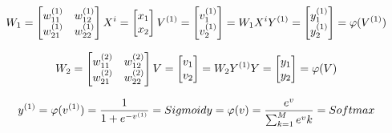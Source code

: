 \documentclass[a4paper]{article}
\begin{document}
\begin{equation}
\newline W_1=\begin{bmatrix}
w^{(1)}_{11}&w^{(1)}_{12}\\ 
w^{(1)}_{21}&w^{(1)}_{22}
\end{bmatrix}
\newline X^{i} = \begin{bmatrix}x_1\\ x_2\end{bmatrix}
\newline V^{(1)} = \begin{bmatrix}v_1^{(1)}\\v_2^{(1)}\end{bmatrix} = W_1X^{i}
\newline Y^{(1)} = \begin{bmatrix}y_1^{(1)}\\y_2^{(1)}\end{bmatrix} = \varphi (V^{(1)})
\end{equation}

\begin{equation}
\newline W_2=\begin{bmatrix}
w^{(2)}_{11}&w^{(2)}_{12}\\ 
w^{(2)}_{21}&w^{(2)}_{22}
\end{bmatrix}
\newline V = \begin{bmatrix}v_1\\v_2\end{bmatrix} = W_2Y^{(1)}
\newline Y = \begin{bmatrix}y_1\\y_2\end{bmatrix} = \varphi (V) 
\end{equation}

\begin{equation}
\newline y^{(1)}=\varphi(v^{(1)}) = \frac{1}{1+e^{-v^{(1)}}} = Sigmoid
\newline y=\varphi(v) = \frac{e^v}{\sum^M_{k=1}{e^vk}} = Softmax
\end{equation}

 
\end{document}
